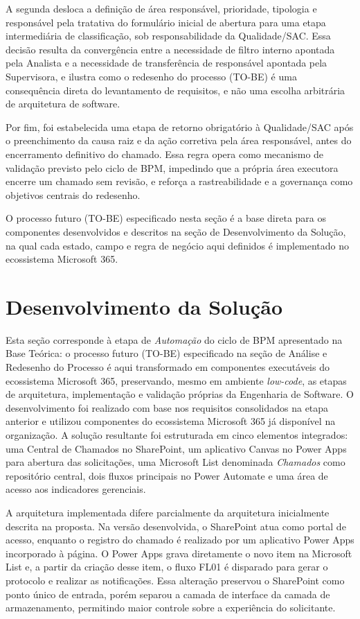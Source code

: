 A segunda desloca a definição de área responsável, prioridade,
tipologia e responsável pela tratativa do formulário inicial
de abertura para uma etapa intermediária de classificação,
sob responsabilidade da Qualidade/SAC. Essa decisão resulta da
convergência entre a necessidade de filtro interno apontada
pela Analista e a necessidade de transferência de responsável
apontada pela Supervisora, e ilustra como o redesenho do
processo (TO-BE) é uma consequência direta do levantamento de
requisitos, e não uma escolha arbitrária de arquitetura de
software.

Por fim, foi estabelecida uma etapa de retorno obrigatório à
Qualidade/SAC após o preenchimento da causa raiz e da ação
corretiva pela área responsável, antes do encerramento
definitivo do chamado. Essa regra opera como mecanismo de
validação previsto pelo ciclo de BPM, impedindo que a própria
área executora encerre um chamado sem revisão, e reforça a
rastreabilidade e a governança como objetivos centrais do
redesenho.

O processo futuro (TO-BE) especificado nesta seção é a base
direta para os componentes desenvolvidos e descritos na seção
de Desenvolvimento da Solução, na qual cada estado, campo e
regra de negócio aqui definidos é implementado no ecossistema
Microsoft 365.

\section{Desenvolvimento da Solução}

Esta seção corresponde à etapa de \textit{Automação} do
ciclo de BPM apresentado na Base Teórica: o processo futuro
(TO-BE) especificado na seção de Análise e Redesenho do
Processo é aqui transformado em componentes executáveis do
ecossistema Microsoft 365, preservando, mesmo em ambiente
\textit{low-code}, as etapas de arquitetura, implementação e
validação próprias da Engenharia de Software. O
desenvolvimento foi realizado com base nos requisitos
consolidados na etapa anterior e utilizou componentes do
ecossistema Microsoft 365 já disponível na organização. A
solução resultante foi estruturada em cinco elementos
integrados: uma Central de Chamados no SharePoint, um
aplicativo Canvas no Power Apps para abertura das
solicitações, uma Microsoft List denominada
\textit{Chamados} como repositório central, dois fluxos
principais no Power Automate e uma área de acesso aos
indicadores gerenciais.

A arquitetura implementada difere parcialmente da
arquitetura inicialmente descrita na proposta. Na versão
desenvolvida, o SharePoint atua como portal de acesso,
enquanto o registro do chamado é realizado por um
aplicativo Power Apps incorporado à página. O Power Apps
grava diretamente o novo item na Microsoft List e, a partir
da criação desse item, o fluxo FL01 é disparado para gerar o
protocolo e realizar as notificações. Essa alteração
preservou o SharePoint como ponto único de entrada, porém
separou a camada de interface da camada de armazenamento,
permitindo maior controle sobre a experiência do
solicitante.

